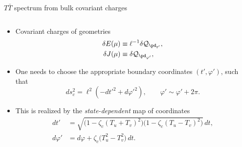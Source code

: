 \documentclass[
	10pt
	,noamsthm
]{beamer}
\newcommand{\TTbar}{\texorpdfstring{\ensuremath{T\bar{T}}}{TTbar}\xspace}
\begin{document}
\begin{frame}{\TTbar spectrum from bulk covariant charges}{%
	\textcite{Kraus:2021cwf,Apolo:2023vnm}
}
\begin{columns}
\begin{column}{\textwidth}
\vspace{-.3\baselineskip}
\begin{itemize}
\item Covariant charges of geometries
	\begin{align*}
		\delta E(\mu) &\equiv  \ell^{-1} \delta \mathcal Q_{\pd_{t'}}, \\ \delta J(\mu) &\equiv  \delta \mathcal Q_{\pd_{\varphi'}},
	\end{align*}

\item One needs to choose the appropriate boundary coordinates $(t',\varphi')$, such that
	\begin{equation}
		ds^2_c = \ell^2 ( -dt'^2 + d\varphi'^2) , \qquad \varphi' \sim \varphi' + 2\pi.\label{cutoffmetric}
	\end{equation}

\pause

\item This is realized by the \textit{state-dependent} map of coordinates
	\begin{align*}
		dt' &= \sqrt{ \big(1 - \zeta_c (T_u+T_v)^2 \big) \big(1 - \zeta_c (T_u-T_v)^2 \big) } \, dt,  \\
		 d\varphi' &= d\varphi + \zeta_c \big( T_u^2 - T_v^2 \big)\,dt.
	\end{align*}
\end{itemize}
\end{column}
\end{columns}
\end{frame}
\end{document}

